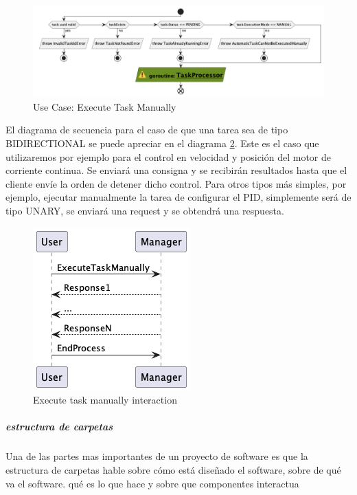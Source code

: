 \begin{figure}[H]
    \centering
    \includegraphics[height=0.2\textheight]{./part/Proyecto_ejecutivo/memoria_descriptiva/descripcionDelProyecto/manager/uml/1-executeTaskManual}
    \caption{Use Case: Execute Task Manually}\label{fig:Use Case-Execute Task Manually}
\end{figure}

El diagrama de secuencia para el caso de que una tarea sea de tipo BIDIRECTIONAL se puede apreciar en el diagrama \ref{fig:executeTaskManualInteraction}. Este es el caso que utilizaremos por ejemplo para el control en velocidad y posición del motor de corriente continua. Se enviará una consigna y se recibirán resultados hasta que el cliente envíe la orden de detener dicho control. Para otros tipos más simples, por ejemplo, ejecutar manualmente la tarea de configurar el PID, simplemente será de tipo UNARY, se enviará una request y se obtendrá una respuesta.

\begin{figure}[H]
    \centering
    \includegraphics[height=0.2\textheight]{./part/Proyecto_ejecutivo/memoria_descriptiva/descripcionDelProyecto/manager/uml/1-ExecuteTaskManuallyInteraction}
    \caption{Execute task manually interaction}\label{fig:executeTaskManualInteraction}
\end{figure}

\subparagraph{estructura de carpetas}

Una de las partes mas importantes de un proyecto de software es que la estructura de carpetas hable sobre cómo está diseñado el software, sobre de qué va el software. qué es lo que hace y sobre que componentes interactua



